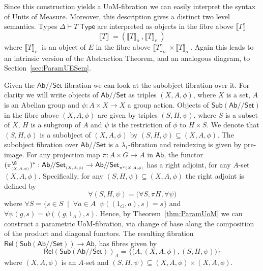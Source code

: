 \documentclass[a4paper,UKenglish]{lipics}
\newcommand{\LamOneFib}{$\lambda_1$-fibration\xspace}
\newcommand{\UoM}{Units of Measure\xspace}
\newcommand{\msf}[1]{\mathsf{#1}} %
\newcommand{\Ab}{\msf{Ab}}
\newcommand{\Set}{\msf{Set}}
\newcommand{\Sub}[1]{\msf{Sub}(#1)}
\newcommand{\Rel}{\msf{Rel}}
\newcommand{\GroupSet}[1]{#1/\!/\Set}
\newcommand{\AbSet}{\GroupSet{\Ab}}
\newcommand{\bbracket}[1]{\bigl( #1 \bigr)}
\newcommand{\sem}[1]{\ensuremath{\llbracket #1 \rrbracket} \;}
\newcommand{\semo}[1]{\ensuremath{\llbracket #1 \rrbracket _o} \;}
\newcommand{\semr}[1]{\ensuremath{\llbracket #1 \rrbracket _r} \;}
\newcommand{\UoMtype}{\Delta \vdash T \; \msf{ Type}}
\newcommand{\UoMFibration}{UoM-fibration\xspace}
\begin{document}
Since this construction yields a UoM-fibration we can easily interpret the syntax of \UoM. Moreover, this description gives a distinct two level semantics. Types $\UoMtype$ are interpreted as objects in the fibre above $\sem{\Gamma}$
\[
 \sem{T} = (\semo{T}, \semr{T})
\]
where $\semr{T}$ is an object of $E$ in the fibre above $\semo{T} \times \semo{T}$. Again this leads to an intrinsic version of the Abstraction Theorem, and an analogous diagram, to Section~\ref{sec:ParamUESem}.



\begin{example}
\label{ex:AbSetParam}
 Given the $\AbSet$ fibration we can look at the subobject fibration over it. For clarity we will write objects of $\AbSet$ as triples $(X,A,\phi)$, where $X$ is a set, $A$ is an Abelian group and $\phi : A\times X \rightarrow X$ a group action. Objects of $\Sub{\AbSet}$ in the fibre above $(X,A,\phi)$ are given by triples $(S,H,\psi)$, where $S$ is a subset of $X$, $H$ is a subgroup of $A$ and $\psi$ is the restriction of $\phi$ to $H\times S$. We denote that $(S,H,\phi)$ is a subobject of $(X,A,\phi)$ by $(S,H,\psi) \subseteq (X,A,\phi)$.
 The subobject fibration over $\AbSet$ is a \LamOneFib and reindexing is given by pre-image. For any projection map $\pi: A\times G \rightarrow A$ in $\Ab$, the functor $(\pi^\S_{_{(X,A,\phi)}})^\ast: \AbSet_{_{(X,A,\phi)}} \rightarrow \AbSet_{_{\pi^\ast (X,A,\phi)}}$ has a right adjoint, for any $A$-set $(X,A,\phi)$. Specifically, for any $(S, H, \psi) \subseteq (X,A,\phi)$ the right adjoint is defined by
 \[
  \forall (S, H, \psi) = \bbracket{ \forall S, \pi H, \forall \psi }
 \]
 where $\forall S = \{ s\in S \; \; | \; \;\forall a\in A \; \; \psi( (1_G, a) , s ) = s  \}$ and $\forall \psi (g,s) = \psi ((g, 1_A),s)$. Hence, by Theorem~\ref{thm:ParamUoM} we can construct a parametric \UoMFibration, via change of base along the composition of the product and diagonal functors. The resulting fibration $\Rel(\Sub{\AbSet})\rightarrow \Ab$, has fibres given by
 \[
\Rel(\Sub{\AbSet})_{A} = \{  \bbracket{A, (X,A,\phi), (S,H,\psi)} \}
 \]
where $(X,A,\phi)$ is an $A$-set and $(S,H,\psi)\subseteq (X,A,\phi) \times (X,A,\phi)$.
\end{example}
\end{document}
